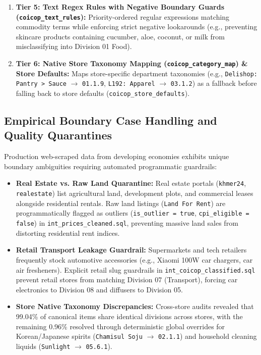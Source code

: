 \documentclass[11pt,a4paper,oneside]{article}
\begin{document}
\begin{enumerate}
        Over 39,200 unique product titles pre-classified using \texttt{gemini-3.1-flash-lite} with structured JSON schemas and few-shot contextual prompts. Cached predictions with confidence score $\ge 0.50$ are applied instantly ($37.8\%$ catalog share, average confidence $95.3\%$). Predictions with confidence $< 0.50$ are routed to \texttt{silver.classification\_queue} for automated re-review.
    \item \textbf{Tier 5: Text Regex Rules with Negative Boundary Guards (\texttt{coicop\_text\_rules}):}
        Priority-ordered regular expressions matching commodity terms while enforcing strict negative lookarounds (e.g., preventing skincare products containing cucumber, aloe, coconut, or milk from misclassifying into Division 01 Food).
    \item \textbf{Tier 6: Native Store Taxonomy Mapping (\texttt{coicop\_category\_map}) \& Store Defaults:}
        Maps store-specific department taxonomies (e.g., \texttt{Delishop: Pantry > Sauce} $\rightarrow$ \texttt{01.1.9}, \texttt{L192: Apparel} $\rightarrow$ \texttt{03.1.2}) as a fallback before falling back to store defaults (\texttt{coicop\_store\_defaults}).
\end{enumerate}

\subsection{Empirical Boundary Case Handling and Quality Quarantines}
Production web-scraped data from developing economies exhibits unique boundary ambiguities requiring automated programmatic guardrails:
\begin{itemize}[noitemsep]
    \item \textbf{Real Estate vs. Raw Land Quarantine:} Real estate portals (\texttt{khmer24}, \texttt{realestate}) list agricultural land, development plots, and commercial leases alongside residential rentals. Raw land listings (\texttt{Land For Rent}) are programmatically flagged as outliers (\texttt{is\_outlier = true}, \texttt{cpi\_eligible = false}) in \texttt{int\_prices\_cleaned.sql}, preventing massive land sales from distorting residential rent indices.
    \item \textbf{Retail Transport Leakage Guardrail:} Supermarkets and tech retailers frequently stock automotive accessories (e.g., Xiaomi 100W car chargers, car air fresheners). Explicit retail slug guardrails in \texttt{int\_coicop\_classified.sql} prevent retail stores from matching Division 07 (Transport), forcing car electronics to Division 08 and diffusers to Division 05.
    \item \textbf{Store Native Taxonomy Discrepancies:} Cross-store audits revealed that 99.04\% of canonical items share identical divisions across stores, with the remaining 0.96\% resolved through deterministic global overrides for Korean/Japanese spirits (\texttt{Chamisul Soju} $\rightarrow$ \texttt{02.1.1}) and household cleaning liquids (\texttt{Sunlight} $\rightarrow$ \texttt{05.6.1}).
\end{itemize}
\end{document}
